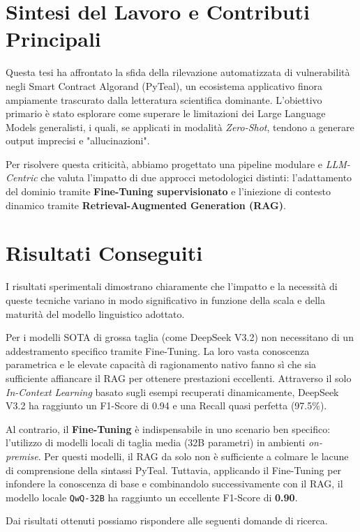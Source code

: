 \section{Sintesi del Lavoro e Contributi Principali}
Questa tesi ha affrontato la sfida della rilevazione automatizzata di vulnerabilità negli Smart Contract Algorand (PyTeal), un ecosistema applicativo finora ampiamente trascurato dalla letteratura scientifica dominante. 
L'obiettivo primario è stato esplorare come superare le limitazioni dei Large Language Models generalisti, i quali, se applicati in modalità \textit{Zero-Shot}, tendono a generare output imprecisi e "allucinazioni".

Per risolvere questa criticità, abbiamo progettato una pipeline modulare e \textit{LLM-Centric} che valuta l'impatto di due approcci metodologici distinti: l'adattamento del dominio tramite \textbf{Fine-Tuning supervisionato} e l'iniezione di contesto dinamico tramite \textbf{Retrieval-Augmented Generation (RAG)}.

\section{Risultati Conseguiti}
I risultati sperimentali dimostrano chiaramente che l'impatto e la necessità di queste tecniche variano in modo significativo in funzione della scala e della maturità del modello linguistico adottato.

Per i modelli SOTA di grossa taglia (come DeepSeek V3.2) non necessitano di un addestramento specifico tramite Fine-Tuning. La loro vasta conoscenza parametrica e le elevate capacità di ragionamento nativo fanno sì che sia sufficiente affiancare il RAG per ottenere prestazioni eccellenti. Attraverso il solo \textit{In-Context Learning} basato sugli esempi recuperati dinamicamente, DeepSeek V3.2 ha raggiunto un F1-Score di 0.94 e una Recall quasi perfetta (97.5\%).

Al contrario, il \textbf{Fine-Tuning} è indispensabile in uno scenario ben specifico: l'utilizzo di modelli locali di taglia media (32B parametri) in ambienti \textit{on-premise}. Per questi modelli, il RAG da solo non è sufficiente a colmare le lacune di comprensione della sintassi PyTeal. Tuttavia, applicando il Fine-Tuning per infondere la conoscenza di base e combinandolo successivamente con il RAG, il modello locale \texttt{QwQ-32B} ha raggiunto un eccellente F1-Score di \textbf{0.90}. 

Dai risultati ottenuti possiamo rispondere alle seguenti domande di ricerca.

